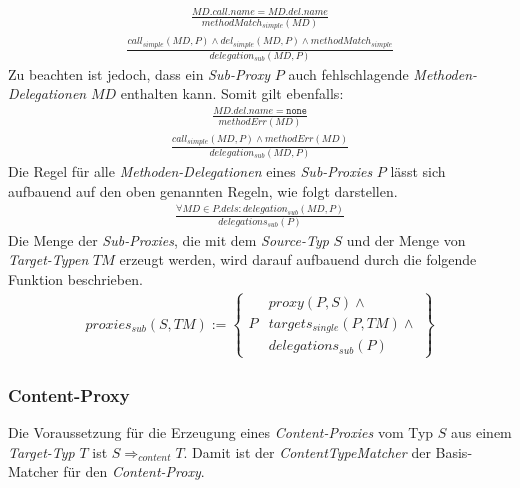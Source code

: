 \begin{gather*}
\frac{\mathit{MD.call.name} = \mathit{MD.del.name}}
{\mathit{methodMatch_{simple}(MD)}}
\end{gather*}
\begin{gather*}
\frac{\mathit{call_{simple}(MD, P)} \wedge \mathit{del_{simple}(MD, P)} \wedge \mathit{methodMatch_{simple}}}
{\mathit{delegation_{sub}(MD, P)}}
\end{gather*}
\noindent
Zu beachten ist jedoch, dass ein \emph{Sub-Proxy} $P$ auch fehlschlagende \emph{Methoden-Delegationen} $\mathit{MD}$ enthalten kann. Somit gilt ebenfalls:
\begin{gather*}
\frac{ \mathit{MD.del.name} = \texttt{none}}
{\mathit{methodErr(MD)}}
\end{gather*}
\begin{gather*}
\frac{\mathit{call_{simple}(MD, P)} \wedge \mathit{methodErr(MD)}}
{\mathit{delegation_{sub}(MD, P)}}
\end{gather*}
\noindent
Die Regel für alle \emph{Methoden-Delegationen} eines \emph{Sub-Proxies} $P$ lässt sich aufbauend auf den oben genannten Regeln, wie folgt darstellen.
\begin{gather*}
\frac{\forall \mathit{MD} \in P.dels: \mathit{delegation_{sub}(MD,P)}}
{\mathit{delegations_{sub}(P)}}
\end{gather*}
\noindent
Die Menge der \emph{Sub-Proxies}, die mit dem \emph{Source-Typ} $S$ und der Menge von \emph{Target-Typen} $\mathit{TM}$ erzeugt werden, wird darauf aufbauend durch die folgende Funktion beschrieben.
\begin{gather*}
\mathit{proxies_{sub}(S,\mathit{TM})} := 
\left\{\begin{array}{l|l}
		& \mathit{proxy(P,S)}\wedge \mathit{ } \\
	P	& \mathit{targets_{single}(P,\mathit{TM})} \wedge \mathit{ } \\
		& \mathit{delegations_{sub}(P)}
		 \end{array}
\right\}
\end{gather*}
\subsubsection{Content-Proxy}
Die Voraussetzung für die Erzeugung eines \emph{Content-Proxies} vom Typ $S$ aus einem \emph{Target-Typ} $T$ ist $S \Rightarrow_{content} T$. Damit ist der \emph{ContentTypeMatcher} der Basis-Matcher für den \emph{Content-Proxy}.
